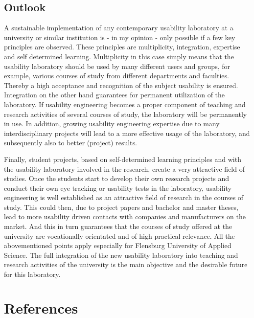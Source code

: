 \begin{
}[h]
\section{Outlook }

A sustainable implementation of any contemporary usability laboratory at a university or similar institution is - in my opinion - only possible if a few key principles are observed. These principles are multiplicity, integration, expertise and self determined learning. Multiplicity in this case simply means that the usability laboratory should be used by many different users and groups, for example, various courses of study from different departments and faculties. Thereby a high acceptance and recognition of the subject usability is ensured. Integration on the other hand guarantees for permanent utilization of the laboratory. If usability engineering becomes a proper component of teaching and research activities of several courses of study, the laboratory will be permanently in use. In addition, growing usability engineering expertise due to many interdisciplinary projects will lead to a more effective usage of the laboratory, and subsequently also to better (project) results.

\begin{styleBodyTextIndent}
Finally, student projects, based on self-determined learning principles and with the usability laboratory involved in the research, create a very attractive field of studies. Once the students start to develop their own research projects and conduct their own eye tracking or usability tests in the laboratory, usability engineering is well established as an attractive field of research in the courses of study. This could then, due to project papers and bachelor and master theses, lead to more {\textquotedbl}usability driven{\textquotedbl} contacts with companies and manufacturers on the market. And this in turn guarantees that the courses of study offered at the university are vocationally orientated and of high practical relevance. All the abovementioned points apply especially for Flensburg University of Applied Science. The full integration of the new usability laboratory into teaching and research activities of the university is the main objective and the desirable future for this laboratory.
\end{styleBodyTextIndent}

\chapter{References}


\end{
}
